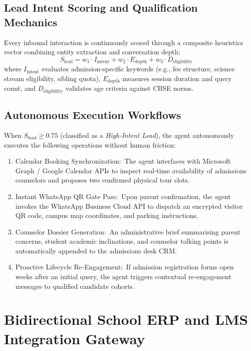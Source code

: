 \documentclass[12pt, a4paper, oneside]{report}
\def\textbf#1{#1}
\def\&{and}
\begin{document}
\subsection{Lead Intent Scoring \& Qualification Mechanics}

Every inbound interaction is continuously scored through a composite heuristics
vector combining entity extraction and conversation depth:
\begin{equation}
  S_{\text{lead}} = w_1 \cdot I_{\text{intent}} + w_2 \cdot E_{\text{depth}} + w_3 \cdot D_{\text{eligibility}}
\end{equation}
where $I_{\text{intent}}$ evaluates admission-specific keywords (e.g., fee structure,
science stream eligibility, sibling quota), $E_{\text{depth}}$ measures session duration
and query count, and $D_{\text{eligibility}}$ validates age criteria against CBSE norms.

\subsection{Autonomous Execution Workflows}

When $S_{\text{lead}} \ge 0.75$ (classified as a \textit{High-Intent Lead}), the
agent autonomously executes the following operations without human friction:
\begin{enumerate}
  \item \textbf{Calendar Booking Synchronization:}\ The agent interfaces with
        Microsoft Graph / Google Calendar APIs to inspect real-time availability
        of admissions counselors and proposes two confirmed physical tour slots.
  \item \textbf{Instant WhatsApp QR Gate Pass:}\ Upon parent confirmation, the
        agent invokes the WhatsApp Business Cloud API to dispatch an encrypted
        visitor QR code, campus map coordinates, and parking instructions.
  \item \textbf{Counselor Dossier Generation:}\ An administrative brief
        summarising parent concerns, student academic inclinations, and
        counselor talking points is automatically appended to the admissions desk CRM.
  \item \textbf{Proactive Lifecycle Re-Engagement:}\ If admission registration
        forms open weeks after an initial query, the agent triggers contextual
        re-engagement messages to qualified candidate cohorts.
\end{enumerate}

\section{Bidirectional School ERP \& LMS Integration Gateway}
\end{document}
